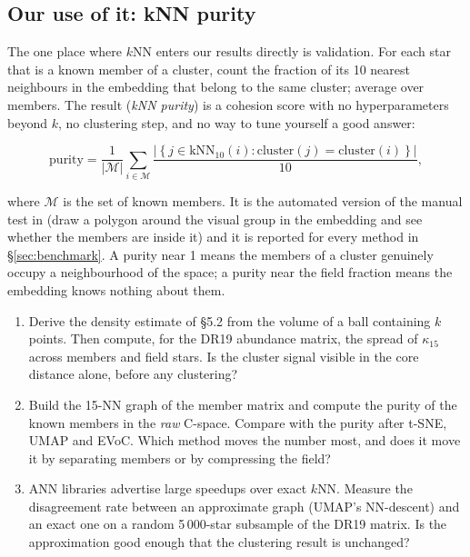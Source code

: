 \subsection{Our use of it: kNN purity}

The one place where $k$NN enters our results directly is validation. For each
star that is a known member of a cluster, count the fraction of its 10 nearest
neighbours in the embedding that belong to the same cluster; average over
members. The result (\emph{kNN purity}) is a cohesion score with no
hyperparameters beyond $k$, no clustering step, and no way to tune yourself a
good answer:

\begin{equation}
\text{purity} = \frac{1}{|\mathcal{M}|}\sum_{i \in \mathcal{M}}
\frac{\left| \left\{ j \in \mathrm{kNN}_{10}(i) : \mathrm{cluster}(j) =
\mathrm{cluster}(i) \right\} \right|}{10},
\end{equation}

where $\mathcal{M}$ is the set of known members. It is the automated version of
the manual test in \citet{Kos:17} (draw a polygon around the visual group in
the embedding and see whether the members are inside it) and it is reported for
every method in \S\ref{sec:benchmark}. A purity near 1 means the members of a
cluster genuinely occupy a neighbourhood of the space; a purity near the field
fraction means the embedding knows nothing about them.

\begin{issues}[EXERCISES]
\begin{enumerate}
\item Derive the density estimate of \S 5.2 from the volume of a ball
  containing $k$ points. Then compute, for the DR19 abundance matrix, the
  spread of $\kappa_{15}$ across members and field stars. Is the cluster
  signal visible in the core distance alone, before any clustering?
\item Build the 15-NN graph of the member matrix and compute the purity of the
  known members in the \emph{raw} C-space. Compare with the purity after
  t-SNE, UMAP and EVoC. Which method moves the number most, and does it move
  it by separating members or by compressing the field?
\item ANN libraries advertise large speedups over exact $k$NN. Measure the
  disagreement rate between an approximate graph (UMAP's NN-descent) and an
  exact one on a random 5\,000-star subsample of the DR19 matrix. Is the
  approximation good enough that the clustering result is unchanged?
\end{enumerate}
\end{issues}
